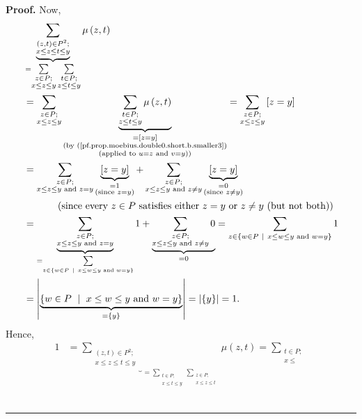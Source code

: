 \documentclass[numbers=enddot,12pt,final,onecolumn,notitlepage]{scrartcl}%
\theoremstyle{definition}
\newenvironment{proof}[1][Proof]{\noindent\textbf{#1.} }{\ \rule{0.5em}{0.5em}}
\newenvironment{vershort}{}{}
\let\sumnonlimits\sum
\renewcommand{\sum}{\sumnonlimits\limits}
\begin{document}
\begin{vershort}
\begin{proof}
Now,%
\begin{align*}
&  \underbrace{\sum_{\substack{\left(  z,t\right)  \in P^{2};\\x\leq z\leq
t\leq y}}}_{=\sum_{\substack{z\in P;\\x\leq z\leq y}}\sum_{\substack{t\in
P;\\z\leq t\leq y}}}\mu\left(  z,t\right) \\
&  =\sum_{\substack{z\in P;\\x\leq z\leq y}}\underbrace{\sum_{\substack{t\in
P;\\z\leq t\leq y}}\mu\left(  z,t\right)  }_{\substack{=\left[  z=y\right]
\\\text{(by (\ref{pf.prop.moebius.double0.short.b.smaller3})}\\\text{(applied
to }u=z\text{ and }v=y\text{))}}}=\sum_{\substack{z\in P;\\x\leq z\leq
y}}\left[  z=y\right] \\
&  =\sum_{\substack{z\in P;\\x\leq z\leq y\text{ and }z=y}}\underbrace{\left[
z=y\right]  }_{\substack{=1\\\text{(since }z=y\text{)}}}+\sum_{\substack{z\in
P;\\x\leq z\leq y\text{ and }z\neq y}}\underbrace{\left[  z=y\right]
}_{\substack{=0\\\text{(since }z\neq y\text{)}}}\\
&  \ \ \ \ \ \ \ \ \ \ \left(  \text{since every }z\in P\text{ satisfies
either }z=y\text{ or }z\neq y\text{ (but not both)}\right) \\
&  =\underbrace{\sum_{\substack{z\in P;\\x\leq z\leq y\text{ and }z=y}%
}}_{=\sum_{z\in\left\{  w\in P\ \mid\ x\leq w\leq y\text{ and }w=y\right\}  }%
}1+\underbrace{\sum_{\substack{z\in P;\\x\leq z\leq y\text{ and }z\neq y}%
}0}_{=0}=\sum_{z\in\left\{  w\in P\ \mid\ x\leq w\leq y\text{ and
}w=y\right\}  }1\\
&  =\left\vert \underbrace{\left\{  w\in P\ \mid\ x\leq w\leq y\text{ and
}w=y\right\}  }_{=\left\{  y\right\}  }\right\vert =\left\vert \left\{
y\right\}  \right\vert =1.
\end{align*}
Hence,%
\begin{align*}
1  &  =\underbrace{\sum_{\substack{\left(  z,t\right)  \in P^{2};\\x\leq z\leq
t\leq y}}}_{=\sum_{\substack{t\in P;\\x\leq t\leq y}}\sum_{\substack{z\in
P;\\x\leq z\leq t}}}\mu\left(  z,t\right)  =\sum_{\substack{t\in P;\\x\leq
}}
\end{align*}
\end{proof}
\end{vershort}
\end{document}
